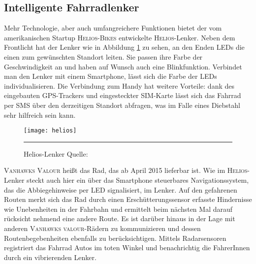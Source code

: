\subsection{Intelligente Fahrradlenker}
Mehr Technologie, aber auch umfangreichere Funktionen bietet der vom amerikanischen Startup \textsc{Helios-Bikes} entwickelte \textsc{Helios}-Lenker. Neben dem Frontlicht hat der Lenker wie in Abbildung \ref{fig:helios} zu sehen, an den Enden \glspl{LED} die einen zum gewünschten Standort leiten. Sie passen ihre Farbe der Geschwindigkeit an und haben auf Wunsch auch eine Blinkfunktion. Verbindet man den Lenker mit einem \gls{Smartphone}, lässt sich die Farbe der \glspl{LED} individualisieren. Die Verbindung zum Handy hat weitere Vorteile: dank des eingebauten \gls{GPS}-Trackers und eingesteckter SIM-Karte lässt sich das Fahrrad per SMS über den derzeitigen Standort abfragen\cite{Helios}, was im Falle eines Diebstahl sehr hilfreich sein kann. 
\begin{figure}[H]
    \centering
    \texttt{[image: helios]}
    \rule{35em}{0.5pt}
    \caption[Helios-Lenker]{Helios-Lenker  Quelle: \cite{Helios}} 		
    \label{fig:helios}
\end{figure}
\textsc{Vanhawks Valour} heißt das Rad, das ab April 2015 lieferbar ist. Wie im \textsc{Helios}-Lenker steckt auch hier ein über das \gls{Smartphone} steuerbares Navigationssystem, das die Abbiegehinweise per \gls{LED} signalisiert, im Lenker. Auf den gefahrenen Routen merkt sich das Rad durch einen Erschütterungssensor erfasste Hindernisse wie Unebenheiten in der Fahrbahn und ermittelt beim nächsten Mal darauf rücksicht nehmend eine andere Route. Es ist darüber hinaus in der Lage mit anderen \textsc{Vanhawks valour}-Rädern zu kommunizieren und dessen Routenbegebenheiten ebenfalls zu berücksichtigen. Mittels Radarsensoren registriert das Fahrrad Autos im toten Winkel und benachrichtig die FahrerInnen durch ein vibrierenden Lenker\cite{vanhawks}.
